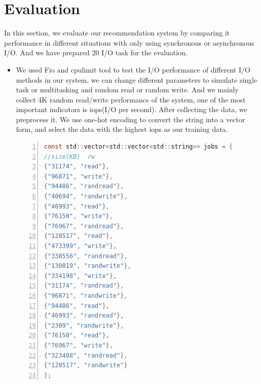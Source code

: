 \documentclass[conference]{IEEEtran}
\begin{document}
\section{Evaluation}
	In this section, we evaluate our recommendation system by comparing it performance in different situations with only using synchronous or asynchronous I/O.
	And we have prepared 20 I/O task for the evaluation.
\begin{itemize}

	\item We used Fio and cpulimit tool to test the I/O performance of different I/O methods in our system,
	 we can change different parameters to simulate single task or multitasking and random read or random write.
	 And we mainly collect 4K random read/write performance of the system, one of the most important indicators is iops(I/O per second).
	 After collecting the data, we preprocess it. We use one-hot encoding to convert the string into a vector form, and select the data with the highest iops as our training data.


	      \begin{lstlisting}[language={C},
		basicstyle=\normalsize\menlo,
        numbers=left]
const std::vector<std::vector<std::string>> jobs = {
//size(KB)  rw
{"31174", "read"},      
{"96871", "write"},      
{"94486", "randread"},
{"40694", "randwrite"}, 
{"46993", "read"},       
{"76150", "write"},
{"76967", "randread"},  
{"128517", "read"},      
{"473399", "write"},
{"338556", "randread"}, 
{"130019", "randwrite"}, 
{"334198", "write"},
{"31174", "randread"},  
{"96871", "randwrite"},  
{"94486", "read"},
{"46993", "randread"},  
{"2309", "randwrite"},   
{"76150", "read"},
{"76967", "write"},     
{"323408", "randread"},  
{"128517", "randwrite"}
};
\end{lstlisting}


\end{itemize}
\end{document}
